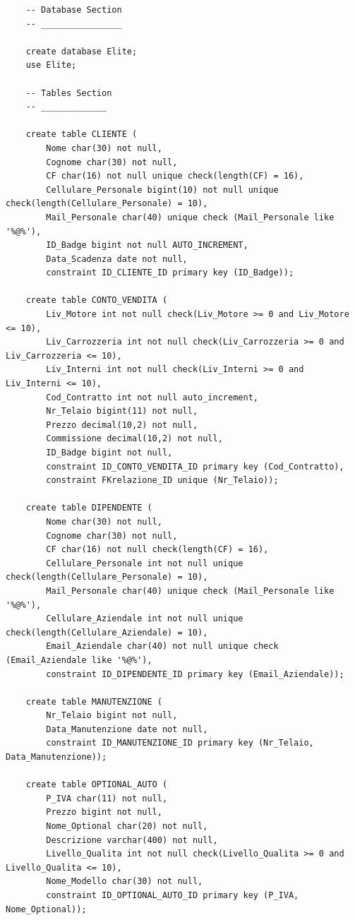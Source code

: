 \documentclass[11pt]{article}
\begin{document}
\begin{lstlisting}
    -- Database Section
    -- ________________ 

    create database Elite;
    use Elite;

    -- Tables Section
    -- _____________ 

    create table CLIENTE (
        Nome char(30) not null,
        Cognome char(30) not null,
        CF char(16) not null unique check(length(CF) = 16),
        Cellulare_Personale bigint(10) not null unique check(length(Cellulare_Personale) = 10),
        Mail_Personale char(40) unique check (Mail_Personale like '%@%'),
        ID_Badge bigint not null AUTO_INCREMENT,
        Data_Scadenza date not null,
        constraint ID_CLIENTE_ID primary key (ID_Badge));

    create table CONTO_VENDITA (
        Liv_Motore int not null check(Liv_Motore >= 0 and Liv_Motore <= 10),
        Liv_Carrozzeria int not null check(Liv_Carrozzeria >= 0 and Liv_Carrozzeria <= 10),
        Liv_Interni int not null check(Liv_Interni >= 0 and Liv_Interni <= 10),
        Cod_Contratto int not null auto_increment,
        Nr_Telaio bigint(11) not null,
        Prezzo decimal(10,2) not null,
        Commissione decimal(10,2) not null,
        ID_Badge bigint not null,
        constraint ID_CONTO_VENDITA_ID primary key (Cod_Contratto),
        constraint FKrelazione_ID unique (Nr_Telaio));

    create table DIPENDENTE (
        Nome char(30) not null,
        Cognome char(30) not null,
        CF char(16) not null check(length(CF) = 16),
        Cellulare_Personale int not null unique check(length(Cellulare_Personale) = 10),
        Mail_Personale char(40) unique check (Mail_Personale like '%@%'),
        Cellulare_Aziendale int not null unique check(length(Cellulare_Aziendale) = 10),
        Email_Aziendale char(40) not null unique check (Email_Aziendale like '%@%'),
        constraint ID_DIPENDENTE_ID primary key (Email_Aziendale));

    create table MANUTENZIONE (
        Nr_Telaio bigint not null,
        Data_Manutenzione date not null,
        constraint ID_MANUTENZIONE_ID primary key (Nr_Telaio, Data_Manutenzione));

    create table OPTIONAL_AUTO (
        P_IVA char(11) not null, 
        Prezzo bigint not null,
        Nome_Optional char(20) not null,
        Descrizione varchar(400) not null,
        Livello_Qualita int not null check(Livello_Qualita >= 0 and Livello_Qualita <= 10),
        Nome_Modello char(30) not null,
        constraint ID_OPTIONAL_AUTO_ID primary key (P_IVA, Nome_Optional));


\end{lstlisting}
\end{document}
